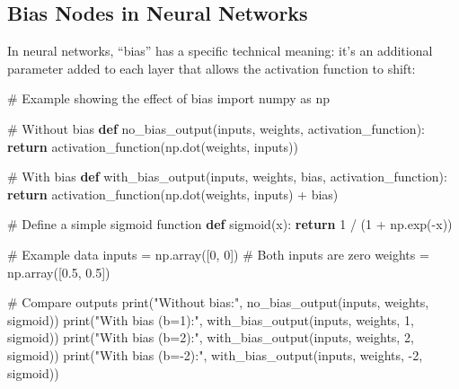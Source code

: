 \documentclass[
  letterpaper,
  DIV=11,
  numbers=noendperiod]{scrreprt}
\newenvironment{Shaded}{\begin{snugshade}}{\end{snugshade}}
\newcommand{\BuiltInTok}[1]{\textcolor[rgb]{0.00,0.23,0.31}{#1}}
\newcommand{\CommentTok}[1]{\textcolor[rgb]{0.37,0.37,0.37}{#1}}
\newcommand{\ControlFlowTok}[1]{\textcolor[rgb]{0.00,0.23,0.31}{\textbf{#1}}}
\newcommand{\DecValTok}[1]{\textcolor[rgb]{0.68,0.00,0.00}{#1}}
\newcommand{\FloatTok}[1]{\textcolor[rgb]{0.68,0.00,0.00}{#1}}
\newcommand{\ImportTok}[1]{\textcolor[rgb]{0.00,0.46,0.62}{#1}}
\newcommand{\KeywordTok}[1]{\textcolor[rgb]{0.00,0.23,0.31}{\textbf{#1}}}
\newcommand{\NormalTok}[1]{\textcolor[rgb]{0.00,0.23,0.31}{#1}}
\newcommand{\OperatorTok}[1]{\textcolor[rgb]{0.37,0.37,0.37}{#1}}
\newcommand{\StringTok}[1]{\textcolor[rgb]{0.13,0.47,0.30}{#1}}
\begin{document}
\subsection{Bias Nodes in Neural
Networks}\label{bias-nodes-in-neural-networks}

In neural networks, ``bias'' has a specific technical meaning: it's an
additional parameter added to each layer that allows the activation
function to shift:

\begin{Shaded}
\begin{Highlighting}[]
\CommentTok{\# Example showing the effect of bias}
\ImportTok{import}\NormalTok{ numpy }\ImportTok{as}\NormalTok{ np}

\CommentTok{\# Without bias}
\KeywordTok{def}\NormalTok{ no\_bias\_output(inputs, weights, activation\_function):}
    \ControlFlowTok{return}\NormalTok{ activation\_function(np.dot(weights, inputs))}

\CommentTok{\# With bias}
\KeywordTok{def}\NormalTok{ with\_bias\_output(inputs, weights, bias, activation\_function):}
    \ControlFlowTok{return}\NormalTok{ activation\_function(np.dot(weights, inputs) }\OperatorTok{+}\NormalTok{ bias)}

\CommentTok{\# Define a simple sigmoid function}
\KeywordTok{def}\NormalTok{ sigmoid(x):}
    \ControlFlowTok{return} \DecValTok{1} \OperatorTok{/}\NormalTok{ (}\DecValTok{1} \OperatorTok{+}\NormalTok{ np.exp(}\OperatorTok{{-}}\NormalTok{x))}

\CommentTok{\# Example data}
\NormalTok{inputs }\OperatorTok{=}\NormalTok{ np.array([}\DecValTok{0}\NormalTok{, }\DecValTok{0}\NormalTok{])  }\CommentTok{\# Both inputs are zero}
\NormalTok{weights }\OperatorTok{=}\NormalTok{ np.array([}\FloatTok{0.5}\NormalTok{, }\FloatTok{0.5}\NormalTok{])}

\CommentTok{\# Compare outputs}
\BuiltInTok{print}\NormalTok{(}\StringTok{"Without bias:"}\NormalTok{, no\_bias\_output(inputs, weights, sigmoid))}
\BuiltInTok{print}\NormalTok{(}\StringTok{"With bias (b=1):"}\NormalTok{, with\_bias\_output(inputs, weights, }\DecValTok{1}\NormalTok{, sigmoid))}
\BuiltInTok{print}\NormalTok{(}\StringTok{"With bias (b=2):"}\NormalTok{, with\_bias\_output(inputs, weights, }\DecValTok{2}\NormalTok{, sigmoid))}
\BuiltInTok{print}\NormalTok{(}\StringTok{"With bias (b={-}2):"}\NormalTok{, with\_bias\_output(inputs, weights, }\OperatorTok{{-}}\DecValTok{2}\NormalTok{, sigmoid))}
\end{Highlighting}
\end{Shaded}
\end{document}
